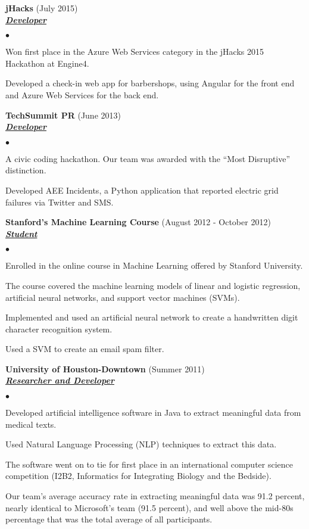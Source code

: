 \documentclass{article}
\newcommand{\employer}[3]{{ \textbf{#1} (#2)\\ \underline{\textbf{\emph{#3}}}\\  }}
\newenvironment{achievements}{\begin{list}{$\bullet$}{\topsep 0pt \itemsep -2pt}}{\vspace*{4pt}\end{list}}
\begin{document}
\employer{jHacks}{July 2015}{Developer}
	\begin{achievements}
	\item Won first place in the Azure Web Services category in the jHacks 2015 Hackathon at Engine4.
	\item Developed a check-in web app for barbershops, using Angular for the front end and Azure Web Services for the back end.
	\end{achievements}

\employer{TechSummit PR}{June 2013}{Developer}
	\begin{achievements}
	\item A civic coding hackathon. Our team was awarded with the ``Most Disruptive'' distinction.
	\item Developed AEE Incidents, a Python application that reported electric grid failures via Twitter and SMS.
	\end{achievements}

\employer{Stanford's Machine Learning Course}{August 2012 - October 2012}{Student}
	\begin{achievements}
	\item Enrolled in the online course in Machine Learning offered by Stanford University.
	\item The course covered the machine learning models of linear and logistic regression, artificial neural networks, and support vector machines (SVMs).
	\item Implemented and used an artificial neural network to create a handwritten digit character recognition system.
	\item Used a SVM to create an email spam filter.   	
	\end{achievements}

\employer{University of Houston-Downtown}{Summer 2011}{Researcher and Developer}
	\begin{achievements}
	\item Developed artificial intelligence software in Java to extract meaningful data from medical texts.
	\item Used Natural Language Processing (NLP) techniques to extract this data. 	
	\item The software went on to tie for first place in an international computer science competition (I2B2, Informatics for Integrating Biology and the Bedside).
	\item Our team's average accuracy rate in extracting meaningful data was 91.2 percent, nearly identical to Microsoft's team (91.5 percent), and well above the mid-80s percentage that was the total average of all participants.
 	\end{achievements}
\end{document}
